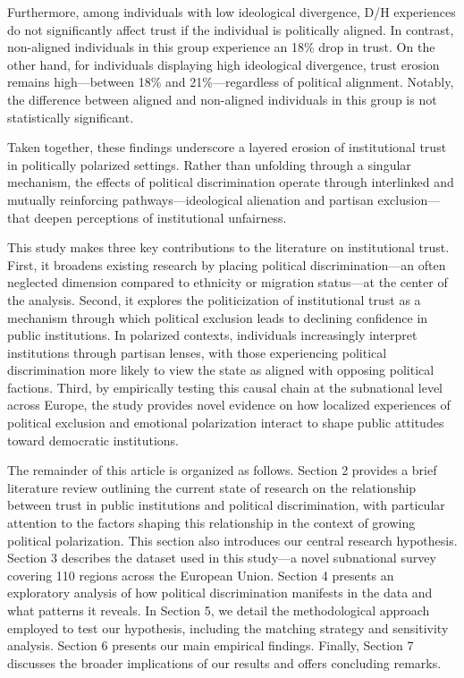 \documentclass{article}
\begin{document}
Furthermore, among individuals with low ideological divergence, D/H experiences do not significantly affect trust if the individual is politically aligned. In contrast, non-aligned individuals in this group experience an 18\% drop in trust. On the other hand, for individuals displaying high ideological divergence, trust erosion remains high—between 18\% and 21\%—regardless of political alignment. Notably, the difference between aligned and non-aligned individuals in this group is not statistically significant.

Taken together, these findings underscore a layered erosion of institutional trust in politically polarized settings. Rather than unfolding through a singular mechanism, the effects of political discrimination operate through interlinked and mutually reinforcing pathways—ideological alienation and partisan exclusion—that deepen perceptions of institutional unfairness.

This study makes three key contributions to the literature on institutional trust. First, it broadens existing research by placing political discrimination—an often neglected dimension compared to ethnicity or migration status—at the center of the analysis. Second, it explores the politicization of institutional trust as a mechanism through which political exclusion leads to declining confidence in public institutions. In polarized contexts, individuals increasingly interpret institutions through partisan lenses, with those experiencing political discrimination more likely to view the state as aligned with opposing political factions. Third, by empirically testing this causal chain at the subnational level across Europe, the study provides novel evidence on how localized experiences of political exclusion and emotional polarization interact to shape public attitudes toward democratic institutions.

The remainder of this article is organized as follows. Section 2 provides a brief literature review outlining the current state of research on the relationship between trust in public institutions and political discrimination, with particular attention to the factors shaping this relationship in the context of growing political polarization. This section also introduces our central research hypothesis. Section 3 describes the dataset used in this study—a novel subnational survey covering 110 regions across the European Union. Section 4 presents an exploratory analysis of how political discrimination manifests in the data and what patterns it reveals. In Section 5, we detail the methodological approach employed to test our hypothesis, including the matching strategy and sensitivity analysis. Section 6 presents our main empirical findings. Finally, Section 7 discusses the broader implications of our results and offers concluding remarks.
\end{document}
